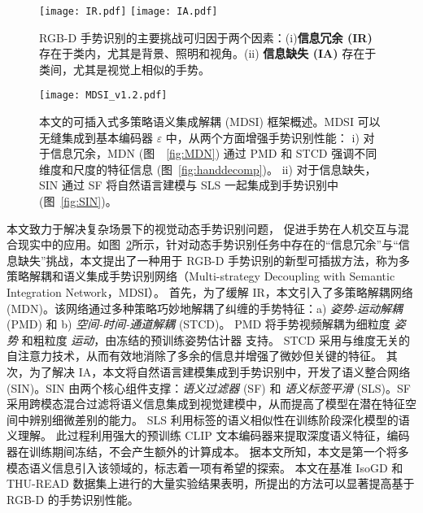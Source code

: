 \begin{figure}[tb]
\centering
{}
{\texttt{[image: IR.pdf]}}
{\texttt{[image: IA.pdf]}}
\caption{RGB-D 手势识别的主要挑战可归因于两个因素：(i)\textbf{信息冗余 (IR)} 存在于类内，尤其是背景、照明和视角。(ii) \textbf{信息缺失 (IA)} 存在于类间，尤其是视觉上相似的手势。}
\label{fig:samples}
\end{figure}


\begin{figure}[tb]
\centering
\texttt{[image: MDSI\_v1.2.pdf]}%
\caption{本文的可插入式多策略语义集成解耦 (MDSI) 框架概述。MDSI 可以无缝集成到基本编码器 $\varepsilon$ 中，从两个方面增强手势识别性能：
i) 对于信息冗余，MDN (图~~\ref{fig:MDN}) 通过 PMD 和 STCD 强调不同维度和尺度的特征信息 (图~\ref{fig:handdecomp})。
ii) 对于信息缺失，SIN 通过 SF 将自然语言建模与 SLS 一起集成到手势识别中 (图~\ref{fig:SIN})。}
\label{fig:MDSI}
\end{figure}

本文致力于解决复杂场景下的视觉动态手势识别问题，
促进手势在人机交互与混合现实中的应用。如图~\ref{fig:MDSI}所示，针对动态手势识别任务中存在的“信息冗余”与“信息缺失”挑战，本文提出了一种用于 RGB-D 手势识别的新型可插拔方法，称为多策略解耦和语义集成手势识别网络（Multi-strategy Decoupling with Semantic Integration Network，MDSI）。
首先，为了缓解 IR，本文引入了多策略解耦网络 (MDN)。该网络通过多种策略巧妙地解耦了纠缠的手势特征：a) \emph{姿势-运动解耦} (PMD) 和 b) \emph{空间-时间-通道解耦} (STCD)。
PMD 将手势视频解耦为细粒度 \emph{姿势} 和粗粒度 \emph{运动}，由冻结的预训练姿势估计器 \cite{sun2019deep} 支持。
STCD 采用与维度无关的自注意力技术，从而有效地消除了多余的信息并增强了微妙但关键的特征。
其次，为了解决 IA，本文将自然语言建模集成到手势识别中，开发了语义整合网络 (SIN)。SIN 由两个核心组件支撑：\emph{语义过滤器} (SF) 和 \emph{语义标签平滑} (SLS)。SF 采用跨模态混合过滤将语义信息集成到视觉建模中，从而提高了模型在潜在特征空间中辨别细微差别的能力。
SLS 利用标签的语义相似性在训练阶段深化模型的语义理解。
此过程利用强大的预训练 CLIP 文本编码器来提取深度语义特征，编码器在训练期间冻结，不会产生额外的计算成本。
据本文所知，本文是第一个将多模态语义信息引入该领域的，标志着一项有希望的探索。
本文在基准 IsoGD 和 THU-READ 数据集上进行的大量实验结果表明，所提出的方法可以显著提高基于 RGB-D 的手势识别性能。

